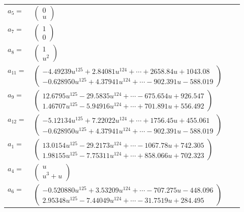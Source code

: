\documentclass[1p]{elsarticle_modified}
\theoremstyle{definition}
\begin{document}
\begin{tabular}{m{7pt} m{180pt} m{7pt} m{180pt} }
\flushright $a_{5}=$&$\begin{pmatrix}0\\u\end{pmatrix}$ \\
\flushright $a_{7}=$&$\begin{pmatrix}1\\0\end{pmatrix}$ \\
\flushright $a_{8}=$&$\begin{pmatrix}1\\u^2\end{pmatrix}$ \\
\flushright $a_{11}=$&$\begin{pmatrix}-4.49239 u^{125}+2.84081 u^{124}+\cdots+2658.84 u+1043.08\\-0.628950 u^{125}+4.37941 u^{124}+\cdots-902.391 u-588.019\end{pmatrix}$ \\
\flushright $a_{9}=$&$\begin{pmatrix}12.6795 u^{125}-29.5835 u^{124}+\cdots-675.654 u+926.547\\1.46707 u^{125}-5.94916 u^{124}+\cdots+701.891 u+556.492\end{pmatrix}$ \\
\flushright $a_{12}=$&$\begin{pmatrix}-5.12134 u^{125}+7.22022 u^{124}+\cdots+1756.45 u+455.061\\-0.628950 u^{125}+4.37941 u^{124}+\cdots-902.391 u-588.019\end{pmatrix}$ \\
\flushright $a_{1}=$&$\begin{pmatrix}13.0154 u^{125}-29.2173 u^{124}+\cdots-1067.78 u+742.305\\1.98155 u^{125}-7.75311 u^{124}+\cdots+858.066 u+702.323\end{pmatrix}$ \\
\flushright $a_{4}=$&$\begin{pmatrix}u\\u^3+u\end{pmatrix}$ \\
\flushright $a_{6}=$&$\begin{pmatrix}-0.520880 u^{125}+3.53209 u^{124}+\cdots-707.275 u-448.096\\2.95348 u^{125}-7.44049 u^{124}+\cdots-31.7519 u+284.495\end{pmatrix}$ \\

\end{tabular}
\end{document}
